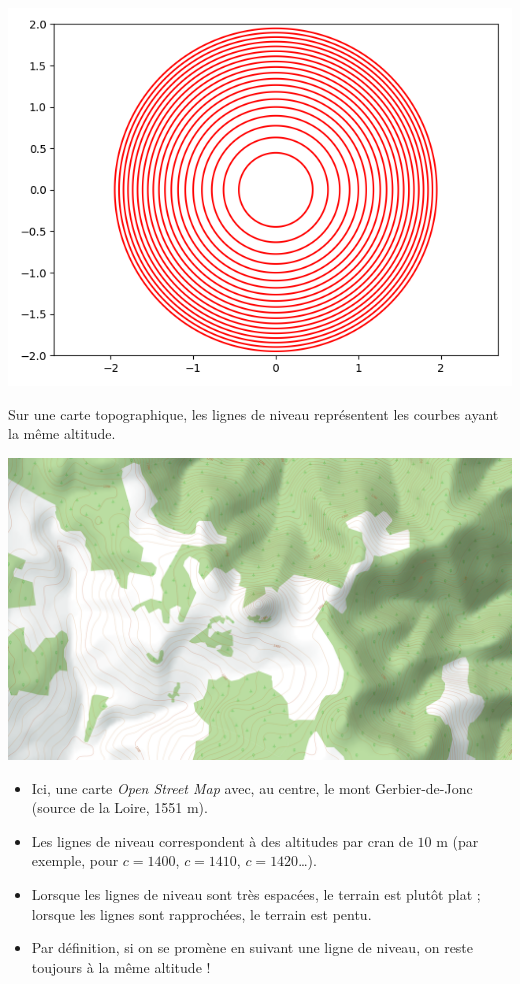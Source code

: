 \documentclass[11pt, class=report,crop=false]{standalone}
\begin{document}
\begin{exemple}
\begin{center}
    \includegraphics[scale=\myscale,scale=0.5]{figures/fonctions-niveau-1d}
\end{center}

\end{exemple}



\begin{exemple}
Sur une carte topographique, les lignes de niveau représentent les courbes ayant la même altitude. 
\begin{center}
  \includegraphics[scale=\myscale,scale=0.4]{figures/fig-plusvar-topo}
\end{center}
\begin{itemize}
  \item Ici, une carte \emph{Open Street Map} avec, au centre, le mont Gerbier-de-Jonc (source de la Loire, 1551 m). 
  \item Les lignes de niveau correspondent à des altitudes par cran de $10$ m (par exemple, pour $c=1400$, $c=1410$, $c=1420$\ldots).
  \item Lorsque les lignes de niveau sont très espacées, le terrain est plutôt plat ; lorsque les lignes sont rapprochées, le terrain est pentu.
  \item Par définition, si on se promène en suivant une ligne de niveau, on reste toujours à la même altitude !
\end{itemize}
\end{exemple}
\end{document}
